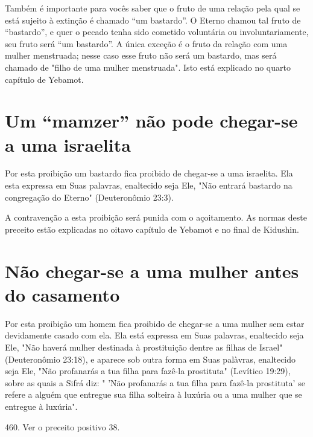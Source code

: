 Também é importante para vocês saber que o fruto de uma relação pela
qual se está sujeito à extinção é chamado ``um bastardo''. O Eterno
cha­mou tal fruto de ``bastardo'', e quer o pecado tenha sido cometido
voluntária ou involuntariamente, seu fruto será ``um bastardo''. A única
exceção é o fruto da relação com uma mulher menstruada; nesse caso esse
fruto não será um bas­tardo, mas será chamado de "filho de uma mulher
menstruada". Isto está ex­plicado no quarto capítulo de Yebamot.

\section{Um ``mamzer'' não pode chegar-se a uma israelita}

Por esta proibição um bastardo fica proibido de chegar-se a uma
is­raelita. Ela esta expressa em Suas palavras, enaltecido seja Ele,
"Não entrará bas­tardo na congregação do Eterno" (Deuteronômio 23:3).

A contravenção a esta proibição será punida com o açoitamento. As normas
deste preceito estão explicadas no oitavo capítulo de Ye­bamot e no
final de Kidushin.

\section{Não chegar-se a uma mulher antes do casamento}

Por esta proibição um homem fica proibido de chegar-se a uma mu­lher sem
estar devidamente casado com ela. Ela está expressa em Suas palavras,
enaltecido seja Ele, "Não haverá mulher destinada à prostituição dentre
as fi­lhas de Israel" (Deuteronômio 23:18), e aparece sob outra forma em
Suas palà­vras, enaltecido seja Ele, "Não profanarás a tua filha para
fazê-la prostituta" (Le­vítico 19:29), sobre as quais a Sifrá diz: "
'Não profanarás a tua filha para fazê-la prostituta' se refere a alguém
que entregue sua filha solteira à luxúria ou a uma mulher que se
entregue à luxúria".

460. Ver o preceito positivo 38.

